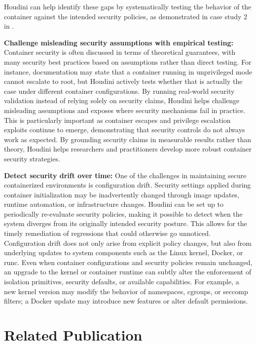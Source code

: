 \documentclass[12pt]{report}
\begin{document}
\begin{doublespace}
Houdini can help identify these gaps by systematically testing the behavior of the container against the intended security policies, as demonstrated in case study 2 in .

\noindent\textbf{Challenge misleading security assumptions with empirical testing:}
Container security is often discussed in terms of theoretical guarantees, with many security best practices based on assumptions rather than direct testing. For instance, documentation may state that a container running in unprivileged mode cannot escalate to root, but Houdini actively tests whether that is actually the case under different container configurations. By running real-world security validation instead of relying solely on security claims, Houdini helps challenge misleading assumptions and exposes where security mechanisms fail in practice. This is particularly important as container escapes and privilege escalation exploits continue to emerge, demonstrating that security controls do not always work as expected. By grounding security claims in measurable results rather than theory, Houdini helps researchers and practitioners develop more robust container security strategies.

\noindent\textbf{Detect security drift over time:} One of the challenges in maintaining secure containerized environments is configuration drift. Security settings applied during container initialization may be inadvertently changed through image updates, runtime automation, or infrastructure changes. Houdini can be set up to periodically re-evaluate security policies, making it possible to detect when the system diverges from its originally intended security posture. This allows for the timely remediation of regressions that could otherwise go unnoticed. Configuration drift does not only arise from explicit policy changes, but also from underlying updates to system components such as the Linux kernel, Docker, or runc. Even when container configurations and security policies remain unchanged, an upgrade to the kernel or container runtime can subtly alter the enforcement of isolation primitives, security defaults, or available capabilities. For example, a new kernel version may modify the behavior of namespaces, cgroups, or seccomp filters; a Docker update may introduce new features or alter default permissions.


\section{Related Publication}


\end{doublespace}
\end{document}

